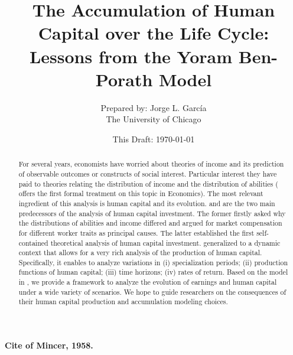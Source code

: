 \documentclass[12pt]{article}
\begin{document}
\title{The Accumulation of Human Capital over the Life Cycle: Lessons from the Yoram Ben-Porath Model}
\author{Prepared by: Jorge L. Garc\'{i}a \\ The University of Chicago}
\date{This Draft: \today}
\maketitle

\begin{flushright}
\textbf{Cite of Mincer, 1958.}
\end{flushright}


\begin{abstract}
\noindent For several years, economists have worried about theories of income and its prediction of observable outcomes or constructs of social interest. Particular interest they have paid to theories relating the distribution of income and the distribution of abilities (\citet{staehle1943ability} offers the first formal treatment on this topic in Economics). The most relevant ingredient of this analysis is human capital and its evolution. \citet{mincer1958investment} and \citet{becker1962investment} are the two main predecessors of the analysis of human capital investment. The former firstly asked why the distributions of abilities and income differed and argued for market compensation for different worker traits as principal causes. The latter established the first self-contained theoretical analysis of human capital investment. \citet{ben1967production} generalized \citet{becker1962investment} to a dynamic context that allows for a very rich analysis of the production of human capital. Specifically, it enables to analyze variations in (i) specialization periods; (ii) production functions of human capital; (iii) time horizons; (iv) rates of return. Based on the model in \citet{ben1967production}, we provide a framework to analyze the evolution of earnings and human capital under a wide variety of scenarios. We hope to guide researchers on the consequences of their human capital production and accumulation modeling choices.
\end{abstract}



\clearpage


\end{document}
